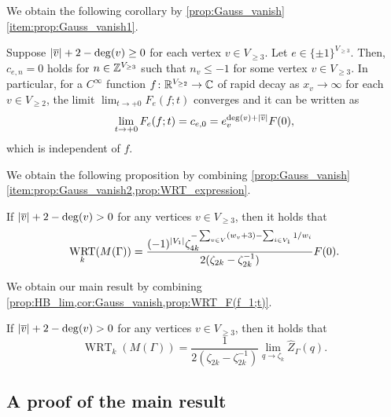 \documentclass[11pt,a4paper,lualatex]{amsart}
\DeclareMathOperator{\WRT}{WRT}
\numberwithin{equation}{section} %
\begin{document}
We obtain the following corollary by \cref{prop:Gauss_vanish} \cref{item:prop:Gauss_vanish1}. 

\begin{cor} \label{cor:Gauss_vanish}	
	Suppose $ \left\lvert\overline{v}\right\rvert + 2 - \deg(v) \ge 0 $ for each vertex $ v \in V_{\ge 3} $.
	Let $ e \in \{ \pm 1 \}^{V_{\ge 3}} $.
	Then, $ c_{e, n} = 0 $ holds for $ n \in \mathbb{Z}^{V_{\ge 3}} $ such that $ n_v \le -1 $ for some vertex $ v \in V_{\ge 3} $.
	In particular, for a $ C^\infty $ function $ f \colon \mathbb{R}^{V_{\ge 2}} \to \mathbb{C} $ of rapid decay as $ x_v \to \infty $ for each $ v \in V_{\ge 2} $, 
	the limit $ \lim_{t \to +0}F_e(f; t) $ converges and it can be written as
	\[
	\lim_{t \to +0}F_e(f; t) 
	= 
	c_{e, 0}
	=
	e_v^{\deg (v) + \left\lvert\overline{v}\right\rvert} F(0),
	\]
	which is independent of $ f $.
\end{cor}

We obtain the following proposition by combining \cref{prop:Gauss_vanish} \cref{item:prop:Gauss_vanish2,prop:WRT_expression}.

\begin{prop} \label{prop:WRT_F(f_1;t)}
	If $ \left\lvert\overline{v}\right\rvert + 2 - \deg(v) > 0 $ for any vertices $ v \in V_{\ge 3} $, then it holds that
	\begin{equation}
		\WRT_k(M(\Gamma))
		= 
		\frac{(-1)^{\abs{V_1}} \zeta_{4k}^{-\sum_{v \in V} (w_{v} + 3) - \sum_{i \in V_1} 1/w_i}}
		{2(\zeta_{2k} - \zeta_{2k}^{-1})}
		F(0) .
	\end{equation}
\end{prop}

We obtain our main result by combining \cref{prop:HB_lim,cor:Gauss_vanish,prop:WRT_F(f_1;t)}.

\begin{cor} \label{cor:HB_WRT}
	If $ \left\lvert\overline{v}\right\rvert + 2 - \deg(v) > 0 $ for any vertices $ v \in V_{\ge 3} $, then it holds that
	\[
	\WRT_k(M(\Gamma))
	=
	\frac{1}{2(\zeta_{2k} - \zeta_{2k}^{-1})}
	\lim_{q \to \zeta_k} \widehat{Z}_\Gamma (q).
	\]
\end{cor}


\subsection{A proof of the main result} \label{subsec:Gauss_vanish_proof}

\end{document}
